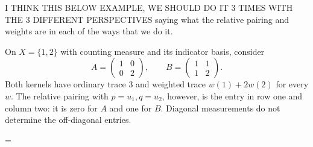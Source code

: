 \label{finite-trace-information-examples}

I THINK THIS BELOW EXAMPLE, WE SHOULD DO IT 3 TIMES WITH THE 3 DIFFERENT PERSPECTIVES saying what the relative pairing and weights are in each of the ways that we do it. 

\begin{example}
On $X=\{1,2\}$ with counting measure and its indicator basis, consider
\[
A=\begin{pmatrix}1&0\\0&2\end{pmatrix},
\qquad B=\begin{pmatrix}1&1\\1&2\end{pmatrix}.
\]
Both kernels have ordinary trace $3$ and weighted trace $w(1)+2w(2)$ for every $w$. The relative pairing with $p=u_1,q=u_2$, however, is the entry in row one and column two: it is zero for $A$ and one for $B$. Diagonal measurements do not determine the off-diagonal entries.
\end{example}
=